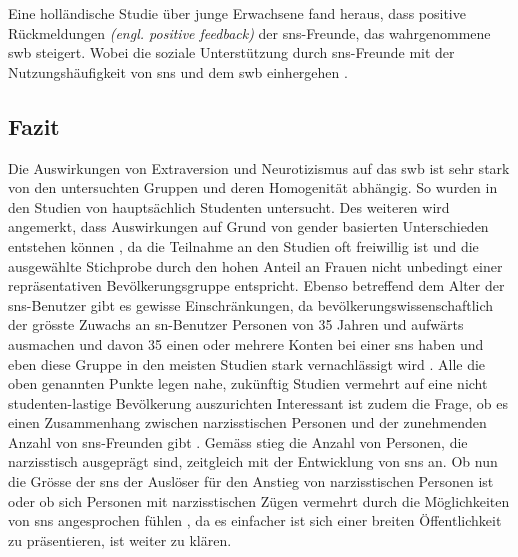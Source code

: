 Eine holländische Studie über junge Erwachsene fand heraus, dass positive Rückmeldungen \textit{(engl. positive feedback)} der \gls{sns}-Freunde, das wahrgenommene \gls{swb} steigert. Wobei die soziale Unterstützung durch \gls{sns}-Freunde mit der Nutzungshäufigkeit von \gls{sns} und dem \gls{swb} einhergehen \cite{Valkenburg:2006}. 

\subsection{Fazit}\label{subsec.traitsFazit}
Die Auswirkungen von Extraversion und Neurotizismus auf das \gls{swb} ist sehr stark von den untersuchten Gruppen und deren Homogenität abhängig. So wurden in den Studien von  hauptsächlich Studenten untersucht. Des weiteren wird angemerkt, dass Auswirkungen auf Grund von gender basierten Unterschieden entstehen können \cite[S.629]{Special:2012}, da die Teilnahme an den Studien oft freiwillig ist und die ausgewählte Stichprobe durch den hohen Anteil an Frauen \cite[S.379]{Manago:2012} nicht unbedingt einer repräsentativen Bevölkerungsgruppe entspricht. Ebenso betreffend dem Alter der \gls{sns}-Benutzer gibt es gewisse Einschränkungen, da bevölkerungswissenschaftlich der grösste Zuwachs an \gls{sn}-Benutzer Personen von 35 Jahren und aufwärts ausmachen \cite{Lenhart:2009} und davon 35\text{\%}  einen oder mehrere Konten bei einer \gls{sns} haben und eben diese Gruppe in den meisten Studien stark vernachlässigt wird \cite{Special:2012}. Alle die oben genannten Punkte legen nahe, zukünftig Studien vermehrt auf eine nicht studenten-lastige Bevölkerung auszurichten \cite[S.363]{Kim:2011} \newline
Interessant ist zudem die Frage, ob es einen Zusammenhang zwischen narzisstischen Personen und der zunehmenden Anzahl von \gls{sns}-Freunden gibt \cite[S.377ff]{Manago:2012}. Gemäss  stieg die Anzahl von Personen, die narzisstisch ausgeprägt sind, zeitgleich mit der Entwicklung von \gls{sns} an. Ob nun die Grösse der \gls{sns} der Auslöser für den Anstieg von narzisstischen Personen ist \cite[S.378]{Manago:2012} oder ob sich Personen mit narzisstischen Zügen vermehrt durch die Möglichkeiten von \gls{sns} angesprochen fühlen \cite{Carpenter:2012}, da es einfacher ist sich einer breiten Öffentlichkeit zu präsentieren, ist weiter zu klären. 








